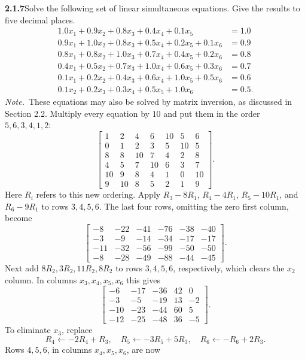 \par\bigskip
\noindent\textbf{2.1.7}\quad Solve the following set of linear simultaneous
equations. Give the results to five decimal places.
\[
\begin{split}
1.0x_{1}+0.9x_{2}+0.8x_{3}+0.4x_{4}+0.1x_{5}&=1.0\\
0.9x_{1}+1.0x_{2}+0.8x_{3}+0.5x_{4}+0.2x_{5}+0.1x_{6}&=0.9\\
0.8x_{1}+0.8x_{2}+1.0x_{3}+0.7x_{4}+0.4x_{5}+0.2x_{6}&=0.8\\
0.4x_{1}+0.5x_{2}+0.7x_{3}+1.0x_{4}+0.6x_{5}+0.3x_{6}&=0.7\\
0.1x_{1}+0.2x_{2}+0.4x_{3}+0.6x_{4}+1.0x_{5}+0.5x_{6}&=0.6\\
0.1x_{2}+0.2x_{3}+0.3x_{4}+0.5x_{5}+1.0x_{6}&=0.5.
\end{split}
\]
\emph{Note.}~These equations may also be solved by matrix inversion, as
discussed in Section 2.2.
\solution
Multiply every equation by $10$ and put them in the order $5,6,3,4,1,2$:
\[
\left[\begin{array}{rrrrrr|r}
1&2&4&6&10&5&6\\
0&1&2&3&5&10&5\\
8&8&10&7&4&2&8\\
4&5&7&10&6&3&7\\
10&9&8&4&1&0&10\\
9&10&8&5&2&1&9
\end{array}\right].
\]
Here $R_i$ refers to this new ordering. Apply
$R_3-8R_1$, $R_4-4R_1$, $R_5-10R_1$, and $R_6-9R_1$ to
rows $3,4,5,6$. The last four rows, omitting the zero first column, become
\[
\left[\begin{array}{rrrrr|r}
-8&-22&-41&-76&-38&-40\\
-3&-9&-14&-34&-17&-17\\
-11&-32&-56&-99&-50&-50\\
-8&-28&-49&-88&-44&-45
\end{array}\right].
\]
Next add $8R_2,3R_2,11R_2,8R_2$ to rows $3,4,5,6$, respectively,
which clears the $x_2$ column.
In columns $x_3,x_4,x_5,x_6$ this gives
\[
\left[\begin{array}{rrrr|r}
-6&-17&-36&42&0\\
-3&-5&-19&13&-2\\
-10&-23&-44&60&5\\
-12&-25&-48&36&-5
\end{array}\right].
\]
To eliminate $x_3$, replace
\[
R_4\leftarrow-2R_4+R_3,\quad
R_5\leftarrow-3R_5+5R_3,\quad
R_6\leftarrow-R_6+2R_3.
\]
Rows $4,5,6$, in columns $x_4,x_5,x_6$, are now
